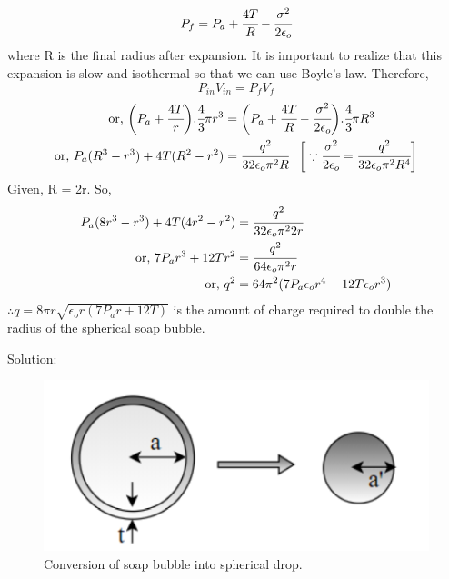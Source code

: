 \begin{equation}
    P_f = P_a + \cfrac{4T}{R} - \cfrac{\sigma^2}{2\epsilon_o}
\end{equation}
where R is the final radius after expansion. It is important to realize that this expansion is slow and isothermal so that we can use  Boyle's law. Therefore,
\begin{equation}
    P_{in}V_{in} = P_f V_f
\end{equation}
\begin{align*}
\text{or, }\bigg(P_a + \cfrac{4T}{r}\bigg) . \cfrac{4}{3} \pi r^3 &= \bigg(P_a + \cfrac{4T}{R} - \cfrac{\sigma^2}{2\epsilon_o}\bigg) . \cfrac{4}{3} \pi R^3\\
\text{or, } P_a (R^3 - r^3) + 4T (R^2 - r^2) &= \cfrac{q^2}{32\epsilon_o\pi^2R} \hspace{8pt} \bigg[\because \cfrac{\sigma^2}{2\epsilon_o} = \cfrac{q^2}{32\epsilon_o\pi^2R^4}\bigg]
\end{align*} 
Given, R = 2r. So,
\begin{align*}
P_a (8r^3 - r^3) + 4T (4r^2 - r^2) &= \cfrac{q^2}{32\epsilon_o\pi^2 2r}\\
\text{or, }  7P_ar^3 + 12Tr^2 &= \cfrac{q^2}{64\epsilon_o\pi^2r}\\
\text{or, }q^2 &= 64 \pi^2 (7P_a\epsilon_or^4 + 12 T\epsilon_or^3)
\end{align*}
$\therefore q = 8\pi r \sqrt{\epsilon_or(7P_ar + 12T)}$ is the amount of charge required to double the radius of the spherical soap bubble.

\pagebreak
{}
Solution:\\

\begin{figure}[h]
    \centering
    \includegraphics[scale = 0.8]{figures/elecmag/fig3.png}
    \caption{Conversion of soap bubble into spherical drop.}
    \label{fig3}
\end{figure}

